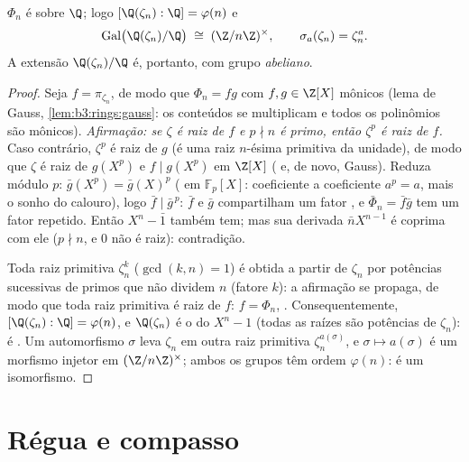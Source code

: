 \begin{theorem}\label{thm:b3:galois:cyclotomicirred}
$\Phi_n$ é  sobre $\Q$; logo $[\Q(\zeta_n) : \Q] =
\varphi(n)$ e
\[
\operatorname{Gal}\bigl(\Q(\zeta_n)/\Q\bigr) \;\cong\;
(\Z/n\Z)^\times,
\qquad \sigma_a(\zeta_n) = \zeta_n^a .
\]
A extensão $\Q(\zeta_n)/\Q$ é, portanto,  com grupo \emph{abeliano}.
\end{theorem}

\begin{proof}
Seja $f = \pi_{\zeta_n}$, de modo que $\Phi_n = fg$ com $f, g \in \Z[X]$ mônicos (lema de Gauss,
\cref{lem:b3:rings:gauss}: os conteúdos se multiplicam e todos os polinômios são
mônicos). \emph{Afirmação: se $\zeta$ é raiz de $f$ e $p \nmid n$ é
primo, então $\zeta^p$ é raiz de $f$.} Caso contrário, $\zeta^p$ é raiz de
$g$ (é uma raiz $n$-ésima primitiva da unidade), de modo que
$\zeta$ é raiz de $g(X^p)$ e $f
\mid g(X^p)$ em $\Z[X]$ ( e, de novo, Gauss). Reduza módulo $p$: $\bar g(X^p) = \bar g(X)^p$ ( em
$\mathbb F_p[X]$: coeficiente a coeficiente $a^p = a$, mais o sonho do calouro), logo
$\bar f \mid \bar g^{\,p}$: $\bar f$ e $\bar g$ compartilham um fator , e
$\bar\Phi_n = \bar f\bar g$ tem um fator repetido. Então $X^n - \bar 1$ também tem; mas sua derivada
$\bar nX^{n-1}$ é coprima com ele ($p \nmid n$, e $0$ não é raiz): contradição.

Toda raiz primitiva $\zeta_n^k$ ($\gcd(k, n) = 1$) é obtida a partir de $\zeta_n$ por
potências sucessivas de primos que não dividem $n$ (fatore $k$):
a afirmação se propaga, de modo que toda raiz primitiva é raiz de
$f$: $f = \Phi_n$, . Consequentemente, $[\Q(\zeta_n):\Q] = \varphi(n)$, e $\Q(\zeta_n)$ é o  do  $X^n - 1$ (todas as raízes são
potências de $\zeta_n$): é . Um automorfismo $\sigma$ leva
$\zeta_n$ em outra raiz primitiva $\zeta_n^{a(\sigma)}$, e $\sigma
\mapsto a(\sigma)$ é um morfismo injetor em
$(\Z/n\Z)^\times$; ambos os grupos têm ordem $\varphi(n)$: é um isomorfismo.
\end{proof}

\section{Régua e compasso}

